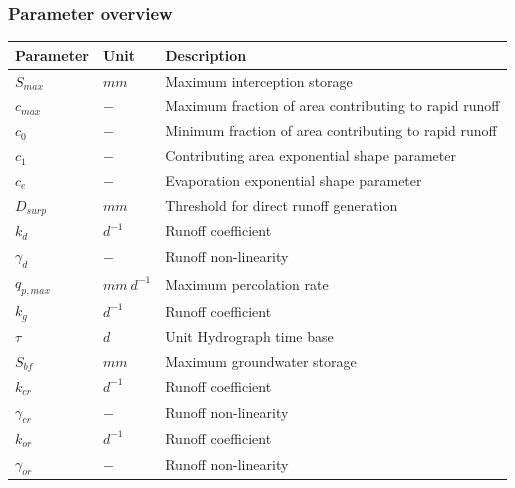 \subsubsection{Parameter overview}
\begin{table}[htbp]
  \centering
    \begin{tabular}{lll}
    \toprule
    Parameter & Unit  & Description \\
    \midrule
    $S_{max}$ & $mm$  & Maximum interception storage \\
    $c_{max}$ & $-$   & Maximum fraction of area contributing to rapid runoff \\
    $c_0$ & $-$   & Minimum fraction of area contributing to rapid runoff \\
    $c_1$ & $-$   & Contributing area exponential shape parameter \\
    $c_e$ & $-$   & Evaporation exponential shape parameter \\
    $D_{surp}$ & $mm$  & Threshold for direct runoff generation \\
    $k_d$ & $d^{-1}$ & Runoff coefficient \\
    $\gamma_d$ & $-$   & Runoff non-linearity \\
    $q_{p,max}$ & $mm~d^{-1}$ & Maximum percolation rate \\
    $k_g$ & $d^{-1}$ & Runoff coefficient \\
    $\tau$ & $d$   & Unit Hydrograph time base \\
    $S_{bf}$ & $mm$  & Maximum groundwater storage \\
    $k_{cr}$ & $d^{-1}$ & Runoff coefficient \\
    $\gamma_{cr}$ & $-$   & Runoff non-linearity \\
    $k_{or}$ & $d^{-1}$ & Runoff coefficient \\
    $\gamma_{or}$ & $-$   & Runoff non-linearity \\
    \bottomrule
    \end{tabular}%
  \label{tab:addlabel}%
\end{table}%
